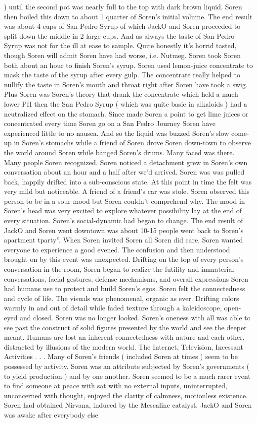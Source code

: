 \documentclass[12pt]{book}
\begin{document}
) until the second pot was nearly full to the top with dark brown liquid. Soren then boiled this down to about 1 quarter of Soren's initial volume. The end result was about 4 cups of San Pedro Syrup of which JackO and Soren proceeded to split down the middle in 2 large cups. And as always the taste of San Pedro Syrup was not for the ill at ease to sample. Quite honestly it's horrid tasted, though Soren will admit Soren have had worse, i.e. Nutmeg. Soren took Soren both about an hour to finish Soren's syrup. Soren used lemon-juice concentrate to mask the taste of the syrup after every gulp. The concentrate really helped to nullify the taste in Soren's mouth and throat right after Soren have took a swig. Plus Soren was Soren's theory that drank the concentrate which held a much lower PH then the San Pedro Syrup ( which was quite basic in alkaloids ) had a neutralized effect on the stomach. Since made Soren a point to get lime juices or concentrated every time Soren go on a San Pedro Journey Soren have experienced little to no nausea. And so the liquid was buzzed Soren's slow come-up in Soren's stomachs while a friend of Soren drove Soren down-town to observe the world around Soren while banged Soren's drums. Many faced was there. Many people Soren recognized. Soren noticed a detachment grew in Soren's own conversation about an hour and a half after we'd arrived. Soren was was pulled back, happily drifted into a sub-conscious state. At this point in time the felt was very mild but noticeable. A friend of a friend's car was stole. Soren observed this person to be in a sour mood but Soren couldn't comprehend why. The mood in Soren's head was very excited to explore whatever possibility lay at the end of every situation. Soren's social-dynamic had began to change. The end result of JackO and Soren went downtown was about 10-15 people went back to Soren's apartment tparty''. When Soren invited Soren all Soren did care, Soren wanted everyone to experience a good evened. The confusion and then understood brought on by this event was unexpected. Drifting on the top of every person's conversation in the room, Soren began to realize the futility and immaterial conversations, facial gestures, defense mechanisms, and overall expressions Soren had humans use to protect and build Soren's egos. Soren felt the connectedness and cycle of life. The visuals was phenomenal, organic as ever. Drifting colors warmly in and out of detail while faded texture through a kaleidoscope, open-eyed and closed. Soren was no longer looked. Soren's oneness with all was able to see past the construct of solid figures presented by the world and see the deeper meant. Humans are lost an inherent connectedness with nature and each other, distracted by illusions of the modern world. The Internet, Television, Incessant Activities . . .  Many of Soren's friends ( included Soren at times ) seem to be possessed by activity. Soren was an attribute subjected by Soren's governments ( to yield production ) and by one another. Soren seemed to be a much rarer event to find someone at peace with sat with no external inputs, uninterrupted, unconcerned with thought, enjoyed the clarity of calmness, motionless existence. Soren had obtained Nirvana, induced by the Mescaline catalyst. JackO and Soren was awake after everybody else 
\end{document}
